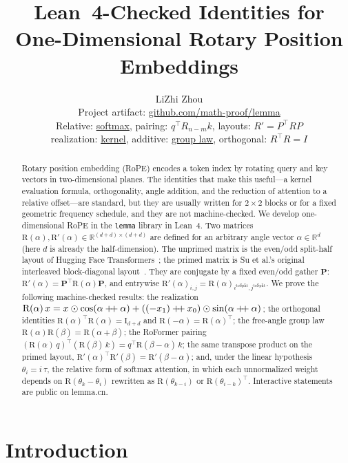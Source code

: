\documentclass[11pt,a4paper]{article}
\title{Lean~4-Checked Identities for\\One-Dimensional Rotary Position Embeddings}
\author{LiZhi Zhou\\[0.3em]
\small Project artifact: \href{https://github.com/math-proof/lemma}{github.com/math-proof/lemma}\\[0.4em]
\small
Relative:
\href{http://www.lemma.cn/lean/?module=Tensor.DotSoftmaxDivDot_Stack_TDot.eq.Stack_Div_SumExp.of.Eq_Stack_Mul}{softmax},
\quad
pairing:
\href{http://www.lemma.cn/lean/?module=Matrix.MulDotMul__Rotary.eq.Dot_MulRotarySub}{$q^\top R_{n-m}k$},
\quad
layouts:
\href{http://www.lemma.cn/lean/?module=Tensor.RotaryMatrix'.eq.DotDot_RotaryMatrix}{$R'=P^\top RP$}\\[0.25em]
realization:
\href{http://www.lemma.cn/lean/?module=Tensor.DotRotaryMatrix.eq.AddMulS}{kernel},
\quad
additive:
\href{http://www.lemma.cn/lean/?module=Tensor.DotRotaryMatrixS.eq.RotaryMatrixAdd}{group law},
\quad
orthogonal:
\href{http://www.lemma.cn/lean/?module=Tensor.DotT_RotaryMatrix.eq.Eye}{$R^\top R=I$}}
\date{}
\newcommand{\R}{\mathbb{R}}
\newcommand{\rot}{\mathrm{R}}
\newcommand{\eye}{\mathrm{I}}
\newcommand{\concat}{\mathbin{+\mkern-4mu+}}
\begin{document}
\maketitle

\begin{abstract}
Rotary position embedding (RoPE) encodes a token index by rotating query and key vectors in two-dimensional planes.
The identities that make this useful---a kernel evaluation formula, orthogonality, angle addition, and the reduction of attention to a relative offset---are standard, but they are usually written for $2\times 2$ blocks or for a fixed geometric frequency schedule, and they are not machine-checked.
We develop one-dimensional RoPE in the \texttt{lemma} library in Lean~4.
Two matrices \(\rot(\alpha),\rot'(\alpha)\in\R^{(d+d)\times(d+d)}\) are defined for an arbitrary angle vector \(\alpha\in\R^d\) (here \(d\) is already the half-dimension).
The unprimed matrix is the even/odd split-half layout of Hugging Face Transformers~\cite{huggingface_rope_utils}; the primed matrix is Su et al.'s original interleaved block-diagonal layout~\cite{su2021roformer}.
They are conjugate by a fixed even/odd gather \(\boldsymbol{P}\):
\(\rot'(\alpha)=\boldsymbol{P}^\top\rot(\alpha)\boldsymbol{P}\),
and entrywise
\(\rot'(\alpha)_{i,j}=\rot(\alpha)_{i^{\mathrm{toSplit}},j^{\mathrm{toSplit}}}\).
We prove the following machine-checked results:
the realization
\(\rot(\alpha)\,x = x\odot\cos(\alpha\concat\alpha)+((-x_1)\concat x_0)\odot\sin(\alpha\concat\alpha)\);
the orthogonal identities \(\rot(\alpha)^\top\rot(\alpha)=\eye_{d+d}\) and \(\rot(-\alpha)=\rot(\alpha)^\top\);
the free-angle group law \(\rot(\alpha)\rot(\beta)=\rot(\alpha+\beta)\);
the RoFormer pairing
\((\rot(\alpha)\,q)^\top(\rot(\beta)\,k)=q^\top\rot(\beta-\alpha)\,k\);
the same transpose product on the primed layout,
\(\rot'(\alpha)^\top\rot'(\beta)=\rot'(\beta-\alpha)\);
and, under the linear hypothesis \(\theta_i=i\,\tau\), the relative form of softmax attention, in which each unnormalized weight depends on \(\rot(\theta_k-\theta_i)\) rewritten as \(\rot(\theta_{k-i})\) or \(\rot(\theta_{i-k})^\top\).
Interactive statements are public on lemma.cn.
\end{abstract}

\section{Introduction}
\label{sec:intro}
\end{document}
